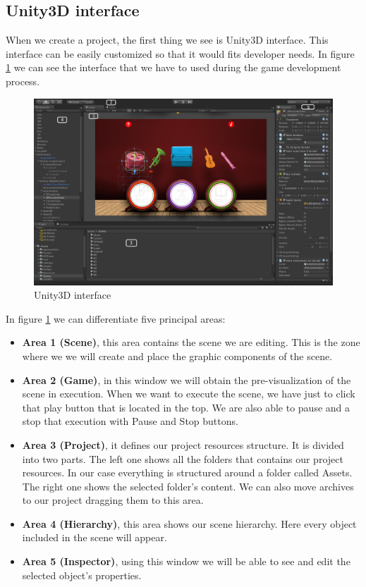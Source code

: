 \subsection{Unity3D interface}
\label{subsec:unityinterface}
When we create a project, the first thing we see is Unity3D interface. This interface can be easily customized so that it would fits developer needs. In figure \ref{fig:unity_interface_general} we can see the interface that we have to used during the game development process.

\begin{figure}[h]
\centering
\includegraphics[width=450pt]{graphics/enabling-tech/unity_interface_general.png}
\caption{Unity3D interface}
\label{fig:unity_interface_general}
\end{figure}

In figure \ref{fig:unity_interface_general} we can differentiate five principal areas:

\begin{itemize}
\item \textbf{Area 1 (Scene)}, this area contains the scene we are editing. This is the zone where we we will create and place the graphic components of the scene.
\item \textbf{Area 2 (Game)}, in this window we will obtain the pre-visualization of the scene in execution. When we want to execute the scene, we have just to click that play button that is located in the top. We are also able to pause and a stop that execution with Pause and Stop buttons.
\item \textbf{Area 3 (Project)}, it defines our project resources structure. It is divided into two parts. The left one shows all the folders that contains our project resources. In our case everything is structured around a folder called Assets. The right one shows the selected folder's content. We can also move archives to our project dragging them to this area.
\item \textbf{Area 4 (Hierarchy)}, this area shows our scene hierarchy. Here every object included in the scene will appear.
\item \textbf{Area 5 (Inspector)}, using this window we will be able to see and edit the selected object's properties.
\end{itemize}

